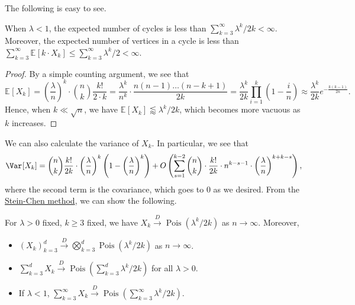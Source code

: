 The following is easy to see.

\begin{lemma}\label{lma:cycle-counting-mean}
	When \(\lambda < 1\), the expected number of cycles is less than \(\sum_{k=3}^{\infty} \lambda ^k / 2k < \infty \). Moreover, the expected number of vertices in a cycle is less than \(\sum_{k=3}^{\infty} \mathbb{E}_{}[k \cdot X_k] \leq \sum_{k=3}^{\infty} \lambda ^k / 2 < \infty \).
\end{lemma}
\begin{proof}
	By a simple counting argument, we see that
	\[
		\mathbb{E}_{}[X_k]
		= \left( \frac{\lambda}{n} \right) ^k \cdot \binom{n}{k} \frac{k!}{2 \cdot k}
		= \frac{\lambda ^k}{n^k} \cdot \frac{n(n-1) \dots (n-k+1)}{2k}
		= \frac{\lambda ^k}{2k} \prod_{i=1}^{k} \left( 1 - \frac{i}{n} \right)
		\approx \frac{\lambda ^k}{2k} e^{- \frac{k (k-1)}{2n}}.
	\]
	Hence, when \(k \ll \sqrt{n} \), we have \(\mathbb{E}_{}[X_k] \lessapprox \lambda ^k / 2k\), which becomes more vacuous as \(k\) increases.
\end{proof}

We can also calculate the variance of \(X_k\). In particular, we see that
\[
	\Var_{}[X_k]
	= \binom{n}{k} \frac{k!}{2k} \cdot \left( \frac{\lambda}{n} \right) ^k \left( 1 - \left( \frac{\lambda}{n} \right) ^k \right) + O\left( \sum_{s=1}^{k-2} \binom{n}{k} \cdot \frac{k!}{2k} \cdot n^{k - s - 1} \cdot \left( \frac{\lambda}{n} \right)^{k + k - s} \right),
\]
where the second term is the covariance, which goes to \(0\) as we desired. From the \hyperref[thm:Stein-Chen-method]{Stein-Chen method}, we can show the following.

\begin{theorem}\label{thm:cycle-counting}
	For \(\lambda > 0\) fixed, \(k \geq 3\) fixed, we have \(X_k \overset{D}{\to} \operatorname{Pois}(\lambda ^k / 2k) \) as \(n \to \infty \). Moreover,
	\begin{itemize}
		\item \((X_k)_{k = 3}^d \overset{D}{\to} \bigotimes_{k=3}^d \operatorname{Pois}(\lambda ^k / 2k) \) as \(n \to \infty \).
		\item \(\sum_{k=3}^{d} X_k \overset{D}{\to} \operatorname{Pois}(\sum_{k=3}^{d} \lambda ^k / 2k) \) for all \(\lambda > 0\).
		\item If \(\lambda < 1\), \(\sum_{k=3}^{\infty} X_k \overset{D}{\to} \operatorname{Pois}(\sum_{k=3}^{\infty} \lambda ^k / 2k) \).
	\end{itemize}
\end{theorem}

